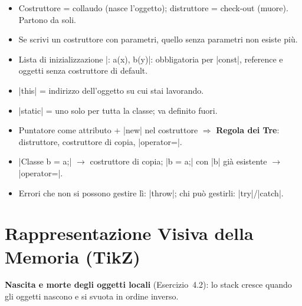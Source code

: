 \begin{inparole}
\begin{itemize}
  \item Costruttore = collaudo (nasce l'oggetto); distruttore = check-out (muore).
        Partono da soli.
  \item Se scrivi un costruttore con parametri, quello senza parametri non esiste più.
  \item Lista di inizializzazione \cc|: a(x), b(y)|: obbligatoria per \cc|const|,
        reference e oggetti senza costruttore di default.
  \item \cc|this| = indirizzo dell'oggetto su cui stai lavorando.
  \item \cc|static| = uno solo per tutta la classe; va definito fuori.
  \item Puntatore come attributo + \cc|new| nel costruttore $\Rightarrow$
        \textbf{Regola dei Tre}: distruttore, costruttore di copia, \cc|operator=|.
  \item \cc|Classe b = a;| $\to$ costruttore di copia; \cc|b = a;| con \cc|b| già
        esistente $\to$ \cc|operator=|.
  \item Errori che non si possono gestire lì: \cc|throw|; chi può gestirli:
        \cc|try|/\cc|catch|.
\end{itemize}
\end{inparole}

\section{Rappresentazione Visiva della Memoria (TikZ)}

\textbf{Nascita e morte degli oggetti locali} (Esercizio~4.2): lo stack cresce
quando gli oggetti nascono e si svuota in ordine inverso.
\begin{center}
\end{center}

